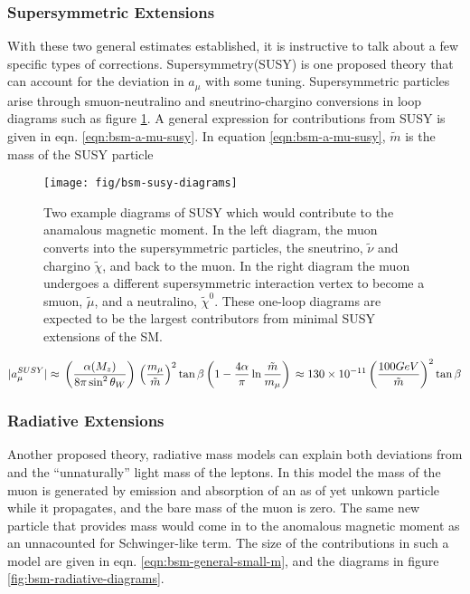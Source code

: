 \subsubsection{Supersymmetric Extensions}
With these two general estimates established, it is instructive to talk about a few specific types of corrections.  Supersymmetry(SUSY) is one proposed theory that can account for the deviation in $a_\mu$ with some tuning.  Supersymmetric particles arise through smuon-neutralino and sneutrino-chargino conversions in loop diagrams such as figure \ref{fig:bsm-susy-diagrams}.  A general expression for contributions from SUSY is given in eqn. \ref{eqn:bsm-a-mu-susy}\cite{a-mu-harbinger}.  In equation \ref{eqn:bsm-a-mu-susy}, $\tilde{m}$ is the mass of the SUSY particle

\begin{figure}
\label{fig:bsm-susy-diagrams}
\centering
\texttt{[image: fig/bsm-susy-diagrams]}
\caption{Two example diagrams of SUSY which would contribute to the anamalous magnetic moment. In the left diagram, the muon converts into the supersymmetric particles, the sneutrino, $\tilde{\nu}$ and chargino $\tilde{\chi}$, and back to the muon.  In the right diagram the muon undergoes a different supersymmetric interaction vertex to become a smuon, $\tilde{\mu}$, and a neutralino, $\tilde{\chi}^0$.  These one-loop diagrams are expected to be the largest contributors from minimal SUSY extensions of the SM.}
\end{figure}

\begin{equation}
\label{eqn:bsm-a-mu-susy}
|a_\mu^{SUSY}| \approx \\
\left(\frac{\alpha(M_z)}{8 \pi \sin^2{\theta_W}} \right) \\
\left( \frac{m_\mu}{\tilde{m}} \right)^2 \tan{\beta} \\
\left(1 - \frac{4\alpha}{\pi}\ln{\frac{\tilde{m}}{m_\mu}} \right) \\
\approx 130 \times 10^{-11} \\
\left(\frac{100 GeV}{\tilde{m}} \right)^2 \tan{\beta}
\end{equation}

\subsubsection{Radiative Extensions}
Another proposed theory, radiative mass models can explain both deviations from \gmtwo and the ``unnaturally'' light mass of the leptons.  In this model the mass of the muon is generated by emission and absorption of an as of yet unkown particle while it propagates, and the bare mass of the muon is zero.  The same new particle that provides mass would come in to the anomalous magnetic moment as an unnacounted for Schwinger-like term.  The size of the contributions in such a model are given in eqn. \ref{eqn:bsm-general-small-m}, and the diagrams in figure \ref{fig:bsm-radiative-diagrams}\cite{a-mu-harbinger}.

